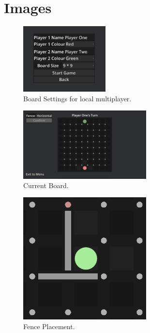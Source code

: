 \documentclass[progress]{cmpreport}
\begin{document}
\section{Images}
\begin{figure}[h]
    \centering
    \includegraphics[width=0.4\textwidth]{images/board_options.png}
    \caption{Board Settings for local multiplayer.}
    \label{fig:options}
\end{figure}
\begin{figure}[h]
    \centering
    \includegraphics[width=0.6\textwidth]{images/current_board.png}
    \caption{Current Board.}
    \label{fig:board}
\end{figure}
\begin{figure}[h]
    \centering
    \includegraphics[width=0.6\textwidth]{images/fence_placement.png}
    \caption{Fence Placement.}
    \label{fig:fence_placement}
\end{figure}
\end{document}

